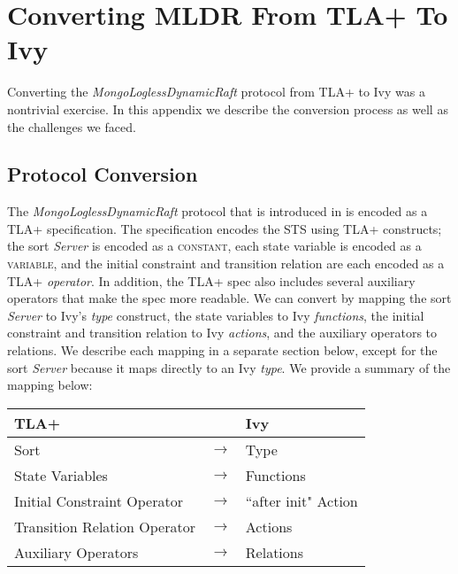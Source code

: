 \documentclass[12pt]{article}
\newcommand{\tla}[1]{{\small\scshape #1}}
\begin{document}



\section{Converting MLDR From TLA+ To Ivy}

Converting the \textit{MongoLoglessDynamicRaft} protocol from TLA+ to Ivy was a nontrivial exercise.  In this appendix we describe the conversion process as well as the challenges we faced.

\subsection{Protocol Conversion}

The \textit{MongoLoglessDynamicRaft} protocol that is introduced in \cite{schultz2021design} is encoded as a TLA+ specification.  The specification encodes the STS using TLA+ constructs; the sort \textit{Server} is encoded as a \tla{constant}, each state variable is encoded as a \tla{variable}, and the initial constraint and transition relation are each encoded as a TLA+ \textit{operator}.  In addition, the TLA+ spec also includes several auxiliary operators that make the spec more readable.  We can convert by mapping the sort \textit{Server} to Ivy's \textit{type} construct, the state variables to Ivy \textit{functions}, the initial constraint and transition relation to Ivy \textit{actions}, and the auxiliary operators to relations.  We describe each mapping in a separate section below, except for the sort \textit{Server} because it maps directly to an Ivy \textit{type}.  We provide a summary of the mapping below:

\begin{center}
\begin{tabular}{lcl}
  TLA+& & Ivy\\
  \hline
  Sort& $\to$& Type\\
  State Variables& $\to$& Functions\\
  Initial Constraint Operator& $\to$& ``after init" Action\\
  Transition Relation Operator& $\to$& Actions\\
  Auxiliary Operators& $\to$& Relations\\
\end{tabular}
\end{center}
\end{document}
